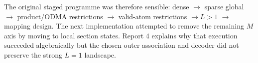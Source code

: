 \documentclass[11pt]{article}
\begin{document}

The original staged programme was therefore sensible: dense $\to$ sparse global $\to$ product/ODMA restrictions
$\to$ valid-atom restrictions $\to L>1$ $\to$ mapping design. The next implementation attempted to remove the remaining
$M$ axis by moving to local section states. Report 4 explains why that execution succeeded algebraically but the chosen
outer association and decoder did not preserve the strong $L=1$ landscape.
\end{document}
